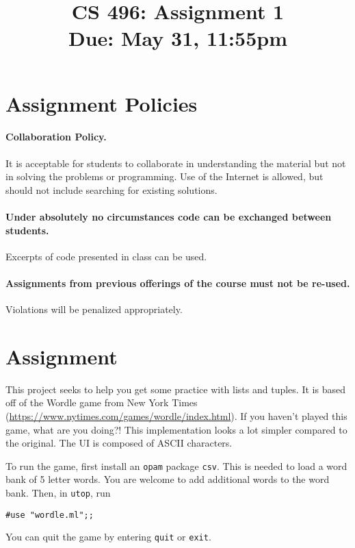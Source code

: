 \documentclass{article}
\title{CS 496: Assignment 1\\
Due: May 31, 11:55pm}
\author{}
\date{}
\newcommand{\code}[1]{\lstinline!#1!}
\begin{document}
\maketitle


\section{Assignment Policies}

\paragraph{Collaboration Policy.}
It is acceptable for students to collaborate in understanding the material but
not in solving the problems or programming. Use of the Internet is allowed, but should not include
searching for existing solutions.

\paragraph{Under absolutely no circumstances code can be exchanged between students.} Excerpts of
code presented in class can be used.

\paragraph{Assignments from previous offerings of the course must not be re-used.} Violations will be penalized
appropriately.

\section{Assignment}

This project seeks to help you get some practice with lists and
tuples. It is based off of the Wordle game from New York Times (\url{https://www.nytimes.com/games/wordle/index.html}). If you haven't played this game, what are you doing?! This implementation looks a lot simpler compared to the original. The UI is composed of ASCII characters.


To run the game, first install an \code{opam} package \code{csv}. This is needed to load a word bank of 5 letter words. You are welcome to add additional words to the word bank. Then, in \code{utop}, run
\begin{center}
  \code{#use "wordle.ml";;}
  \end{center}
You can quit the game by entering \code{quit} or \code{exit}.
\end{document}
